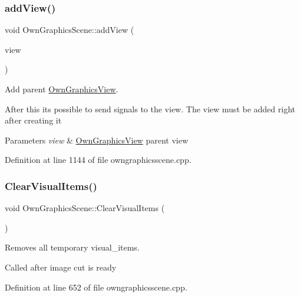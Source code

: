 \mbox{\label{classOwnGraphicsScene_a8677d9cbb1f01943c303be0985c84fbe}} 
\subsubsection{\texorpdfstring{add\+View()}{addView()}}
{\footnotesize\ttfamily void Own\+Graphics\+Scene\+::add\+View (\begin{DoxyParamCaption}\item[{\mbox{\hyperlink{classOwnGraphicsView}{Own\+Graphics\+View}} $\ast$}]{view }\end{DoxyParamCaption})}



Add parent \mbox{\hyperlink{classOwnGraphicsView}{Own\+Graphics\+View}}. 

After this it\textquotesingle{}s possible to send signals to the view. The view must be added right after creating it 
\begin{DoxyParams}{Parameters}
{\em view} & \mbox{\hyperlink{classOwnGraphicsView}{Own\+Graphics\+View}} parent view \\
\hline
\end{DoxyParams}


Definition at line 1144 of file owngraphicsscene.\+cpp.

\mbox{\label{classOwnGraphicsScene_a158c6430ca8e07642b693e37ec05119e}} 
\subsubsection{\texorpdfstring{Clear\+Visual\+Items()}{ClearVisualItems()}}
{\footnotesize\ttfamily void Own\+Graphics\+Scene\+::\+Clear\+Visual\+Items (\begin{DoxyParamCaption}{ }\end{DoxyParamCaption})}



Removes all temporary visual\+\_\+items. 

Called after image cut is ready 

Definition at line 652 of file owngraphicsscene.\+cpp.


